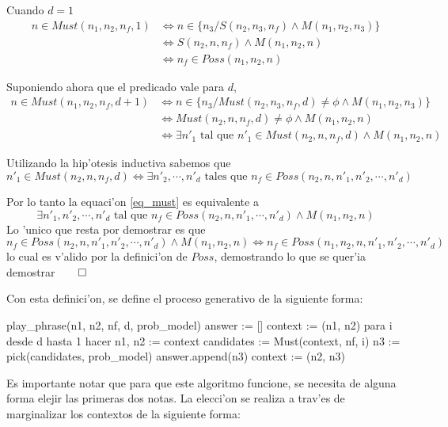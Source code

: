 Cuando $d=1$
\begin{align*}
n \in Must(n_1, n_2, n_f, 1)   & \Leftrightarrow n \in \{n_3/ S(n_2, n_3, n_f) \land M(n_1, n_2, n_3)\} \\
                               & \Leftrightarrow S(n_2, n, n_f) \land M(n_1, n_2, n)   \\
                               & \Leftrightarrow n_f \in Poss(n_1, n_2, n)
\end{align*}

Suponiendo ahora que el predicado vale para $d$, 
\begin{align}
n \in Must(n_1, n_2, n_f, d+1)   & \Leftrightarrow n \in \{n_3/ Must(n_2, n_3, n_f, d) \neq \phi \land M(n_1,n_2, n_3)\} \nonumber \\
                                 & \Leftrightarrow Must(n_2, n, n_f, d) \neq \phi \land M(n_1,n_2, n) \nonumber \\
                                 & \Leftrightarrow \exists n'_1 \text{ tal que } n'_1 \in Must(n_2, n, n_f, d) \land M(n_1,n_2, n) \label{eq_must}
\end{align}

Utilizando la hip'otesis inductiva sabemos que 
$$  n'_1 \in Must(n_2, n, n_f, d) \Leftrightarrow \exists n'_2, \cdots, n'_{d} \text{ tales que } n_f \in Poss(n_2, n, n'_1, n'_2, \cdots, n'_{d})$$

Por lo tanto la equaci'on \ref{eq_must} es equivalente a
$$ \exists n'_1, n'_2, \cdots, n'_d \text{ tal que } n_f \in Poss(n_2, n, n'_1, \cdots, n'_d) \land M(n_1,n_2, n) $$
Lo 'unico que resta por demostrar es que 
$$ n_f \in Poss(n_2, n, n'_1, n'_2, \cdots, n'_d) \land M(n_1,n_2, n) \Leftrightarrow n_f \in Poss(n_1, n_2, n, n'_1, n'_2, \cdots, n'_d)$$
lo cual es v'alido por la definici'on de $Poss$, demostrando lo que se quer'ia demostrar$\qed$


Con esta definici'on, se define el proceso generativo de la siguiente forma:

\begin{algoritmo}
play_phrase(n1, n2, nf, d, prob_model)
    answer := []
    context := (n1, n2)
    para i desde d hasta 1 hacer
        n1, n2 := context
        candidates := Must(context, nf, i)
        n3 := pick(candidates, prob_model)
        answer.append(n3)
        context := (n2, n3) 
\end{algoritmo}

Es importante notar que para que este algoritmo funcione, se necesita de alguna forma elejir las primeras dos notas. La elecci'on se realiza a trav'es de 
marginalizar los contextos de la siguiente forma:

